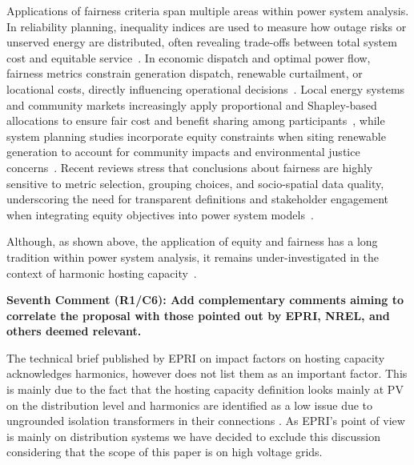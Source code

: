 \documentclass[10pt]{article}
\begin{document}
\begin{tcolorbox}[colback=black!5!white,colframe=black]
Applications of fairness criteria span multiple areas within power system analysis. In reliability planning, inequality indices are used to measure how outage risks or unserved energy are distributed, often revealing trade-offs between total system cost and equitable service~\cite{heylen_fairness_2019}. In economic dispatch and optimal power flow, fairness metrics constrain generation dispatch, renewable curtailment, or locational costs, directly influencing operational decisions~\cite{sun_gini_2020}. Local energy systems and community markets increasingly apply proportional and Shapley-based allocations to ensure fair cost and benefit sharing among participants~\cite{obrien_shapley_2015}, while system planning studies incorporate equity constraints when siting renewable generation to account for community impacts and environmental justice concerns~\cite{lohr_integration_2024}. Recent reviews stress that conclusions about fairness are highly sensitive to metric selection, grouping choices, and socio-spatial data quality, underscoring the need for transparent definitions and stakeholder engagement when integrating equity objectives into power system models~\cite{goforth_incorporating_2025}. \newline

Although, as shown above, the application of equity and fairness has a long tradition within power system analysis, it remains under-investigated in the context of harmonic hosting capacity~\cite{santos_considerations_2015}.

\end{tcolorbox}

\textbf{Seventh Comment (R1/C6): Add complementary comments aiming to correlate the proposal with those pointed out by EPRI, NREL, and others deemed relevant.}

\begin{tcolorbox}[colback=black!5!white,colframe=black]
The technical brief published by EPRI on impact factors on hosting capacity \cite{epri_impact_2018} acknowledges harmonics, however does not list them as an important factor. This is mainly due to the fact that the hosting capacity definition looks mainly at PV on the distribution level and harmonics are identified as a low issue due to ungrounded isolation transformers in their connections \cite{epri_distribution_2015}. As EPRI's point of view is mainly on distribution systems we have decided to exclude this discussion considering that the scope of this paper is on high voltage grids.

\end{tcolorbox}
\end{document}

